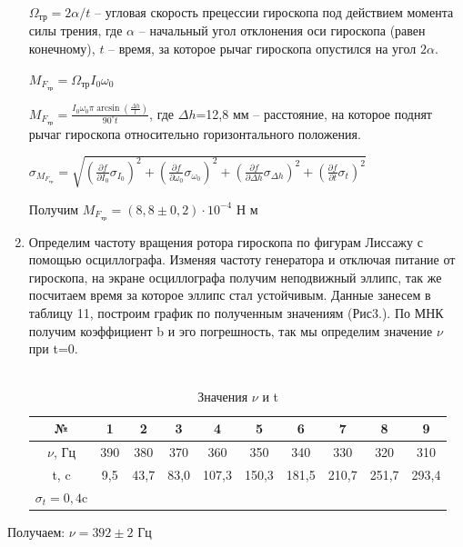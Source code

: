 \documentclass[a4paper, 12pt]{article}%
\begin{document}
\begin{enumerate}
	$\Omega_{\text{тр}} = 2\alpha/t$ -- угловая скорость прецессии гироскопа под действием момента силы трения, где $\alpha$ -- начальный угол отклонения оси гироскопа (равен конечному), $t$ -- время, за которое рычаг гироскопа опустился на угол $2\alpha$.
	
	$M_{F_{\text{тр}}} =\Omega_{\text{тр}} I_{0}\omega_{0}$
	
	$M_{F_{\text{тр}}} = \frac{ I_{0}\omega_{0}\pi \arcsin\left(\frac{\Delta h}{l}\right)}{90^{\circ} t}$, где $\Delta h$=12,8 мм -- расстояние, на которое поднят рычаг гироскопа относительно горизонтального положения.
	
	 $\sigma_{M_{ F_{\text{тр}}}} = \sqrt{(\frac{\partial f}{\partial I_0}\sigma_{I_0})^2 + (\frac{\partial f}{\partial \omega_0}\sigma_{\omega_0})^2+(\frac{\partial f}{\partial \Delta h}\sigma_{\Delta h})^2 +(\frac{\partial f}{\partial t}\sigma_t)^2}$
	
	Получим $M_{F_{\text{тр}}}= (8,8\pm 0,2)\cdot 10^{-4}$ Н м
	
	
	\item Определим частоту вращения ротора гироскопа по фигурам Лиссажу с помощью осциллографа. Изменяя частоту генератора и отключая питание от гироскопа, на экране осциллографа получим неподвижный эллипс, так же посчитаем время за которое эллипс стал устойчивым. Данные занесем  в таблицу 11, построим график по полученным значениям (Рис3.). По МНК получим коэффициент b  и эго погрешность, так мы определим значение $\nu$ при t=0. \\ \\
	
	\begin{longtable}{|c|c|c|c|c|c|c|c|c|c|}
		\hline 
		№ & 1 & 2 & 3& 4&5&6&7&8&9\\
		\hline
		$\nu$, Гц & 390 & 380 &370&360&350&340&330&320&310\\
		\hline
		t, c &9,5 &43,7 &83,0& 107,3&150,3&181,5&210,7&251,7&293,4\\
		\hline
		\caption{Значения $\nu$ и t}
		$\sigma_t=0,4$c
	\end{longtable}
		\end{enumerate}
	Получаем: $\nu=392\pm2$ Гц
	
\end{document}

